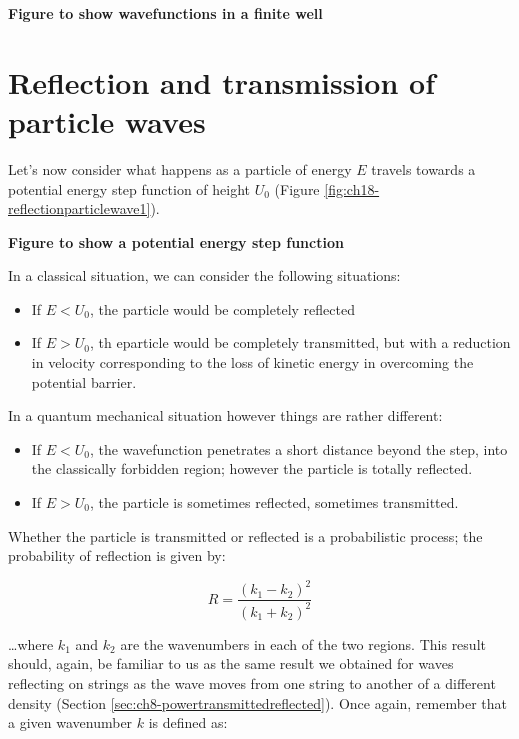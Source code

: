 \documentclass[
]{book}
\providecommand{\tightlist}{%
  \setlength{\itemsep}{0pt}\setlength{\parskip}{0pt}}
\begin{document}
\textbf{Figure to show wavefunctions in a finite well}

\hypertarget{sec:ch18-reflectionparticlewaves}{%
\section{Reflection and transmission of particle waves}\label{sec:ch18-reflectionparticlewaves}}

Let's now consider what happens as a particle of energy \(E\) travels towards a potential energy step function of height \(U_0\) (Figure \ref{fig:ch18-reflectionparticlewave1}).

\textbf{Figure to show a potential energy step function}
\label{fig:ch18-reflectionparticlewave1}

In a classical situation, we can consider the following situations:

\begin{itemize}
\tightlist
\item
  If \(E<U_0\), the particle would be completely reflected
\item
  If \(E>U_0\), th eparticle would be completely transmitted, but with a reduction in velocity corresponding to the loss of kinetic energy in overcoming the potential barrier.
\end{itemize}

In a quantum mechanical situation however things are rather different:

\begin{itemize}
\tightlist
\item
  If \(E<U_0\), the wavefunction penetrates a short distance beyond the step, into the classically forbidden region; however the particle is totally reflected.
\item
  If \(E>U_0\), the particle is sometimes reflected, sometimes transmitted.
\end{itemize}

Whether the particle is transmitted or reflected is a probabilistic process; the probability of reflection is given by:

\begin{equation}
R = \frac{(k_1 - k_2)^2}{(k_1 + k_2)^2}
\end{equation}

\ldots where \(k_1\) and \(k_2\) are the wavenumbers in each of the two regions. This result should, again, be familiar to us as the same result we obtained for waves reflecting on strings as the wave moves from one string to another of a different density (Section \ref{sec:ch8-powertransmittedreflected}). Once again, remember that a given wavenumber \(k\) is defined as:
\end{document}
